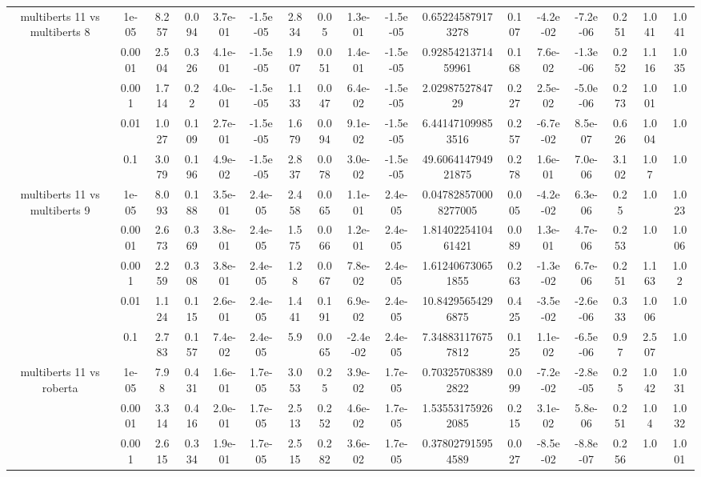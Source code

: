 \begin{tabular}{|c|c|c|c|c|c|c|c|c|c|c|c|c|c|c|c|c|}
\hline
\multirow{5}{*}{multiberts 11 vs multiberts 8} & 1e-05 & 8.257 & 0.094 & 3.7e-01 & -1.5e-05 & 2.834 & 0.05 & 1.3e-01 & -1.5e-05 & 0.652245879173278 & 0.107 & -4.2e-02 & -7.2e-06 & 0.251 & 1.041 & 1.041 \\
 & 0.0001 & 2.504 & 0.326 & 4.1e-01 & -1.5e-05 & 1.907 & 0.051 & 1.4e-01 & -1.5e-05 & 0.9285421371459961 & 0.168 & 7.6e-02 & -1.3e-06 & 0.252 & 1.116 & 1.035 \\
 & 0.001 & 1.714 & 0.22 & 4.0e-01 & -1.5e-05 & 1.133 & 0.047 & 6.4e-02 & -1.5e-05 & 2.0298752784729 & 0.227 & 2.5e-02 & -5.0e-06 & 0.273 & 1.001 & 1.0 \\
 & 0.01 & 1.027 & 0.109 & 2.7e-01 & -1.5e-05 & 1.679 & 0.094 & 9.1e-02 & -1.5e-05 & 6.441471099853516 & 0.257 & -6.7e-02 & 8.5e-07 & 0.626 & 1.004 & 1.0 \\
 & 0.1 & 3.079 & 0.196 & 4.9e-02 & -1.5e-05 & 2.837 & 0.078 & 3.0e-02 & -1.5e-05 & 49.606414794921875 & 0.278 & 1.6e-01 & 7.0e-06 & 3.102 & 1.07 & 1.0 \\
\hline
\multirow{5}{*}{multiberts 11 vs multiberts 9} & 1e-05 & 8.093 & 0.188 & 3.5e-01 & 2.4e-05 & 2.458 & 0.065 & 1.1e-01 & 2.4e-05 & 0.047828570008277005 & 0.005 & -4.2e-02 & 6.3e-06 & 0.25 & 1.0 & 1.023 \\
 & 0.0001 & 2.673 & 0.369 & 3.8e-01 & 2.4e-05 & 1.575 & 0.066 & 1.2e-01 & 2.4e-05 & 1.8140225410461421 & 0.089 & 1.3e-01 & 4.7e-06 & 0.253 & 1.0 & 1.006 \\
 & 0.001 & 2.259 & 0.308 & 3.8e-01 & 2.4e-05 & 1.28 & 0.067 & 7.8e-02 & 2.4e-05 & 1.612406730651855 & 0.263 & -1.3e-02 & 6.7e-06 & 0.251 & 1.163 & 1.02 \\
 & 0.01 & 1.124 & 0.115 & 2.6e-01 & 2.4e-05 & 1.441 & 0.191 & 6.9e-02 & 2.4e-05 & 10.84295654296875 & 0.425 & -3.5e-02 & -2.6e-06 & 0.333 & 1.006 & 1.0 \\
 & 0.1 & 2.783 & 0.157 & 7.4e-02 & 2.4e-05 & 5.9 & 0.065 & -2.4e-02 & 2.4e-05 & 7.348831176757812 & 0.125 & 1.1e-02 & -6.5e-06 & 0.97 & 2.507 & 1.0 \\
\hline
\multirow{5}{*}{multiberts 11 vs roberta } & 1e-05 & 7.98 & 0.431 & 1.6e-01 & 1.7e-05 & 3.053 & 0.25 & 3.9e-02 & 1.7e-05 & 0.703257083892822 & 0.099 & -7.2e-02 & -2.8e-05 & 0.25 & 1.042 & 1.031 \\
 & 0.0001 & 3.314 & 0.416 & 2.0e-01 & 1.7e-05 & 2.513 & 0.252 & 4.6e-02 & 1.7e-05 & 1.535531759262085 & 0.215 & 3.1e-02 & 5.8e-06 & 0.251 & 1.04 & 1.032 \\
 & 0.001 & 2.615 & 0.334 & 1.9e-01 & 1.7e-05 & 2.515 & 0.282 & 3.6e-02 & 1.7e-05 & 0.378027915954589 & 0.027 & -8.5e-02 & -8.8e-07 & 0.256 & 1.0 & 1.001 \\

\end{tabular}
